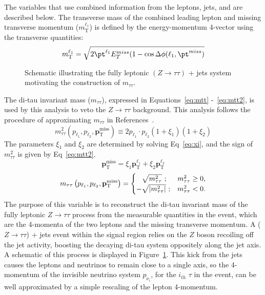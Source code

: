 The variables that use combined information from the leptons, jets, and \met{} are described below.  The transverse mass of the combined leading lepton and missing transverse momentum ($m_\text{T}^{\ell_1}$) is defined by the energy-momentum 4-vector using the transverse quantities:
\begin{equation}
\label{eq:mt}
m_\mathrm{T}^{\ell_1} = \sqrt{2\pt^{\ell_1}E^{miss}_T(1-\cos\Delta\phi(\ell_1,\pt^{miss})} 
\end{equation}
   \begin{figure}
  \centering
  
  \caption{Schematic illustrating the fully leptonic $(Z\to\tau\tau)$ + jets system motivating the construction of $m_{\tau\tau}$. }
  \label{fig:ditau_schematic}
  \end{figure}
The di-tau invariant mass ($m_{\tau\tau}$), expressed in Equations~\ref{eq:mtt} -~\ref{eq:mtt2}, is used by this analysis to veto the $Z\rightarrow\tau\tau$ background.  This analysis follows the procedure of approximating $m_{\tau\tau}$ in References~\cite{Han:2014kaa, Baer:2014kya}. 
 \begin{equation}
 \label{eq:mtt}
 m^2_{\tau\tau}\left(p_{\ell_1}, p_{\ell_2}, \mathbf{p}_\mathrm{T}^\mathrm{miss}\right) \equiv 2p_{\ell_1}\cdot p_{\ell_2}(1+\xi_1)(1+\xi_2)
 \end{equation}
 The parameters $\xi_1$ and $\xi_2$ are determined by solving Eq~\ref{eq:xi}, and the sign of $m^2_{\tau\tau}$ is given by Eq~\ref{eq:mtt2}.
  \begin{equation}
   \label{eq:xi}
  \mathbf{p}_\mathrm{T}^\mathrm{miss} = \xi_1\mathbf{p}_\mathrm{T}^\mathrm{\ell_1}+\xi_2\mathbf{p}_\mathrm{T}^\mathrm{\ell_2}
   \end{equation}
 \begin{equation}
 \label{eq:mtt2}
 m_{\tau\tau}\left(p_{\ell_1}, p_{\ell_2}, \mathbf{p}_\mathrm{T}^\mathrm{miss}\right) =
\begin{cases}
\hphantom{-}\sqrt{m_{\tau\tau}^2}~;               & m_{\tau\tau}^2 \geq 0,\\
 -\sqrt{\left| m_{\tau\tau}^2\right|}~; & m_{\tau\tau}^2 < 0.
\end{cases} 
 \end{equation} 
 The purpose of this variable is to reconstruct the di-tau invariant mass of the fully leptonic $Z\rightarrow\tau\tau$ process from the measurable quantities in the event, which are the 4-momenta of the two leptons and the missing transverse momentum.  A ($Z\rightarrow\tau\tau$) + jets event within the signal region relies on the $Z$ boson recoiling off the jet activity, boosting the decaying di-tau system oppositely along the jet axis.  A schematic of this process is displayed in Figure~\ref{fig:ditau_schematic}.  This kick from the jets causes the leptons and neutrinos to remain close to a single axis, so the 4-momentum of the invisible neutrino system $p_{\nu_i}$, for the $i_{th}$ $\tau$ in the event, can be well approximated by a simple rescaling of the lepton 4-momentum.  
 
